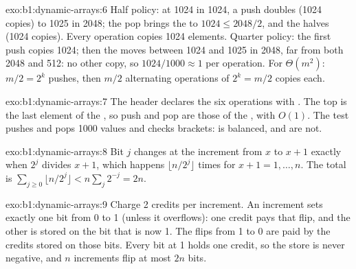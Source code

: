 \begin{solution}{exo:b1:dynamic-arrays:6}
Half policy: at  1024 in  1024, a push doubles (1024 copies) to  1025 in 2048; the pop brings the  to
$1024 \leq 2048/2$, and the  halves (1024 copies). Every operation copies 1024 elements. Quarter policy: the first
push copies 1024; then the  moves between 1024 and 1025 in  2048, far from both 2048 and 512: no other copy,
so $1024/1000 \approx 1$ per operation. For $\Theta(m^2)$: $m/2 = 2^k$ pushes, then $m/2$ alternating operations of
$2^k = m/2$ copies each.
\end{solution}

\begin{solution}{exo:b1:dynamic-arrays:7}
The header  declares the six operations with . The top is the
last element of the , so push and pop are those of the , with  $O(1)$. The test pushes and pops
1000 values and checks brackets: \code{([()[]])} is balanced, \code{([)]} and \code{((} are not.
\end{solution}

\begin{solution}{exo:b1:dynamic-arrays:8}
Bit $j$ changes at the increment from $x$ to $x + 1$ exactly when $2^j$ divides $x + 1$, which happens $\lfloor n/2^j
\rfloor$ times for $x + 1 = 1, \dots, n$. The total is $\sum_{j \geq 0} \lfloor n/2^j \rfloor < n \sum_j 2^{-j} = 2n$.
\end{solution}

\begin{solution}{exo:b1:dynamic-arrays:9}
Charge 2 credits per increment. An increment sets exactly one bit from 0 to 1 (unless it overflows): one credit pays that
flip, and the other is stored on the bit that is now 1. The flips from 1 to 0 are paid by the credits stored on those
bits. Every bit at 1 holds one credit, so the store is never negative, and $n$ increments flip at most $2n$ bits.
\end{solution}

